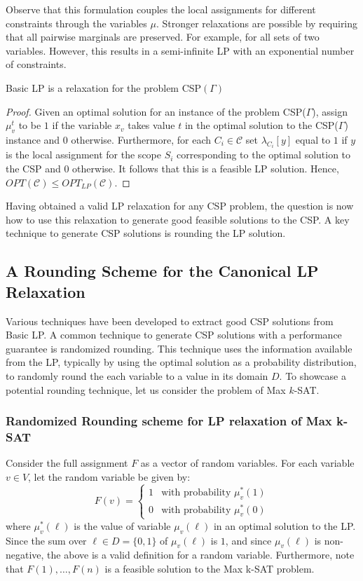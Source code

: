Observe that this formulation couples the local assignments for different constraints through the variables $\mu$. 
Stronger relaxations are possible by requiring that all pairwise marginals are preserved. For example, for all sets of two variables. 
However, this results in a semi-infinite LP with an exponential number of constraints. 

\fi

\begin{thm}
	Basic LP is a relaxation for the problem CSP$(\Gamma)$
\end{thm}
\begin{proof}
	Given an optimal solution for an instance of the problem CSP($\Gamma$), assign $\mu_v^t$ to be $1$ if the variable $x_v$ takes value $t$ in the optimal solution to the CSP($\Gamma$) instance and $0$ otherwise.
	Furthermore, for each $C_i \in \mathcal{C}$ set $\lambda_{C_i}[y]$ equal to $1$ if $y$ is the local assignment for the scope $S_i$ corresponding to the optimal solution to the CSP and $0$ otherwise. 
	It follows that this is a feasible LP solution. 
	Hence, $OPT(\mathcal{C}) \le OPT_{LP}(\mathcal{C})$.
\end{proof}

Having obtained a valid LP relaxation for any CSP problem, the question is now how to use this relaxation to generate good feasible solutions to the CSP. 
A key technique to generate CSP solutions is rounding the LP solution.

\subsection{A Rounding Scheme for the Canonical LP Relaxation}
Various techniques have been developed to extract good CSP solutions from Basic LP.
A common technique to generate CSP solutions with a performance guarantee is randomized rounding.
This technique uses the information available from the LP, typically by using the optimal solution as a probability distribution, to randomly round the each variable to a value in its domain $D$.
To showcase a potential rounding technique, let us consider the problem of Max $k$-SAT.

\subsubsection{Randomized Rounding scheme for LP relaxation of Max k-SAT}
Consider the full assignment $F$ as a vector of random variables. For each variable $v \in V$, let the random variable be given by:
\[
	F(v) = \begin{cases}
	1 & \text{with probability } \mu^*_v(1)\\
	0 & \text{with probability } \mu^*_v(0)
	\end{cases}
\]
where $\mu^*_v(\ell)$ is the value of variable $\mu_v(\ell)$ in an optimal solution to the LP.
Since the sum over $\ell \in D = \{0,1\}$ of  $\mu_v(\ell)$ is $1$, and since $\mu_v(\ell)$ is non-negative, the above is a valid definition for a random variable. 
Furthermore, note that $F(1), \dots, F(n)$ is a feasible solution to the Max k-SAT problem.

